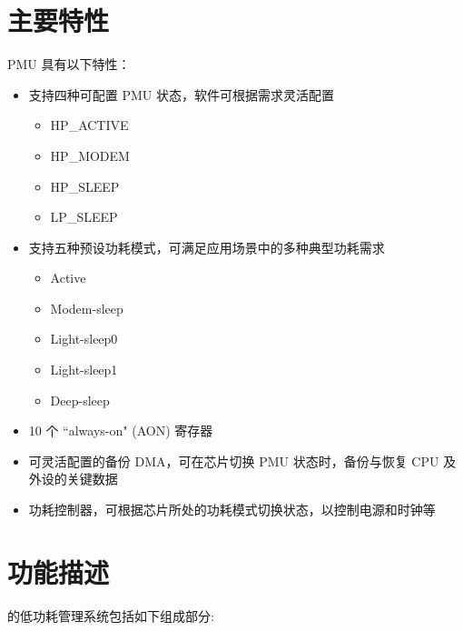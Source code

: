 \documentclass[main\_\_CN.tex]{subfiles}
\begin{document}
\section{主要特性}

PMU 具有以下特性：

\begin{itemize}
    \item 支持四种可配置 PMU 状态，软件可根据需求灵活配置
    \begin{itemize}
        \item HP\_ACTIVE
        \item HP\_MODEM
        \item HP\_SLEEP
        \item LP\_SLEEP
    \end{itemize}
    \item 支持五种预设功耗模式，可满足应用场景中的多种典型功耗需求
    \begin{itemize}
        \item Active
        \item Modem-sleep
        \item Light-sleep0
        \item Light-sleep1
        \item Deep-sleep
    \end{itemize}
    \item 10 个 ``always-on" (AON) 寄存器
    \item 可灵活配置的备份 DMA，可在芯片切换 PMU 状态时，备份与恢复 CPU 及外设的关键数据
    \item 功耗控制器，可根据芯片所处的功耗模式切换状态，以控制电源和时钟等
\end{itemize}

\section{功能描述}

\chipname{} 的低功耗管理系统包括如下组成部分:
\end{document}
